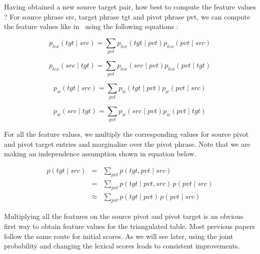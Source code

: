 Having obtained a new source target pair, how best to compute the feature values ? For source phrase src, target phrase tgt and pivot phrase pvt, we can compute the feature values like in~\cite{Utiyama:07} using the following equations : 

 		\begin{equation} \label{eq:first}
                 p_{lex}(tgt \mid src) = \sum_{pvt} p_{lex}(tgt \mid pvt) p_{lex}(pvt \mid src)
        \end{equation}

        \begin{equation}
        	p_{lex}(src \mid tgt) = \sum_{pvt} p_{lex}(src \mid pvt) p_{lex}(pvt \mid tgt)
        \end{equation}

         \begin{equation}
        	p_w(tgt \mid src) = \sum_{pvt} p_w(tgt \mid pvt) p_w(pvt \mid src)
        \end{equation}

        \begin{equation} \label{eq:last}
        	p_w(src \mid tgt) = \sum_{pvt} p_w(src \mid pvt) p_w(pvt \mid tgt)
        \end{equation}

        For all the feature values, we multiply the corresponding values for source pivot and pivot target entries and marginalize over the pivot phrase. Note that we are making an independence assumption shown in equation below. 

         \begin{eqnarray*} \label{eq:independence}
                p(tgt \mid src)&=&\sum_{pvt}{p(tgt, pvt \mid src)}\\
                &=& \sum_{pvt}{p(tgt \mid pvt, src)\,p(pvt \mid src)}\\
                &\approx& \sum_{pvt}{p(tgt \mid pvt)\,p(pvt \mid src)}
        \end{eqnarray*}

        Multiplying all the features on the source pivot and pivot target is an obvious first way to obtain feature values for the triangulated table. Most previous papers follow the same route for initial scores. As we will see later, using the joint probability and changing the lexical scores leads to consistent improvements. 



\newcommand{\maninexample}[1]{\emph{$\grave{a}$ $l\acute{a}$ $b\acute{a}\acute{a}r\acute{a}$ \textipa{\textltailn}$\acute{u}m\acute{a}$ $k\acute{o}s\acute{ɔ}n$}}


